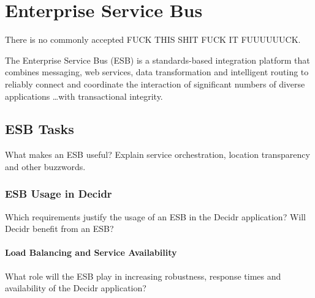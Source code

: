 %
%

\chapter{Enterprise Service Bus}
\label{chap:enterprise-service-bus}


There is no commonly accepted FUCK THIS SHIT FUCK IT FUUUUUUCK.

The Enterprise Service Bus (ESB) is a standards-based integration platform that
combines messaging, web services, data transformation and intelligent routing to
reliably connect and coordinate the interaction of significant numbers of diverse
applications \ldots with transactional integrity.\cite{chappell}

\section{ESB Tasks}
\label{sec:esb-tasks}
What makes an ESB useful? Explain service orchestration, location transparency
and other buzzwords.

\subsection{ESB Usage in Decidr}
\label{subsec:esb-usage-in-decidr}
Which requirements justify the usage of an ESB in the Decidr application? 
Will Decidr benefit from an ESB?

\subsubsection{Load Balancing and Service Availability}
\label{subsubsec:load-balancing-and-service-availability}
What role will the ESB play in increasing robustness, response times and
availability of the Decidr application?

